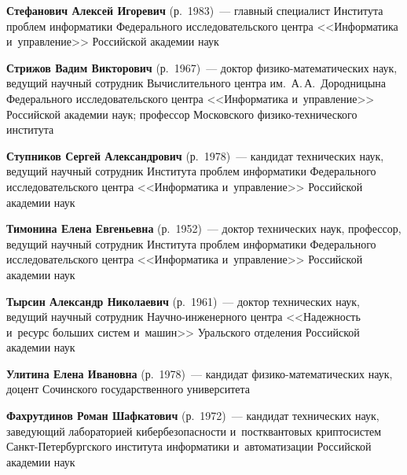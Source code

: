 \begin{multicols}{2}

\noindent
\textbf{Стефанович Алексей Игоревич} (р.\ 1983)~--- главный специалист Института 
проб\-лем информатики Федерального исследовательского центра 
<<Информатика и~управ\-ле\-ние>> Российской академии наук


\noindent
\textbf{Стрижов Вадим Викторович} (р.\ 1967)~--- 
доктор фи\-зи\-ко-ма\-те\-ма\-ти\-че\-ских наук, ведущий научный сотрудник 
Вычислительного центра им.\ А.\,А.~Дородницына Федерального 
исследовательского центра <<Информатика и~управ\-ле\-ние>>
 Российской академии наук; профессор Московского 
 фи\-зи\-ко-тех\-ни\-че\-ско\-го института


\noindent
\textbf{Ступников Сергей Александрович} (р.\ 1978)~--- 
кандидат технических наук, ведущий научный сотрудник Института проб\-лем 
информатики Федерального исследовательского центра <<Информатика и~управ\-ле\-ние>>
 Российской академии наук
 

 \noindent
\textbf{Тимонина Елена Евгеньевна} (р.\ 1952)~--- 
доктор технических наук, профессор, ведущий научный сотрудник Института проб\-лем
 информатики Федераль\-ного исследовательского центра <<Информатика и~управ\-ле\-ние>>
 Российской академии наук
 

\noindent
\textbf{Тырсин Александр Николаевич} (р.\ 1961)~--- доктор технических наук, 
ведущий научный сотрудник На\-уч\-но-ин\-же\-нер\-но\-го центра 
<<Надежность и~ресурс больших сис\-тем и~машин>>
Уральского отделения Российской академии наук



\noindent
\textbf{Улитина Елена Ивановна} (р.\ 1978)~--- 
кандидат фи\-зи\-ко-ма\-те\-ма\-ти\-че\-ских наук, 
доцент Сочинского государственного университета


\noindent
\textbf{Фахрутдинов Роман Шафкатович} (р.\ 1972)~--- 
кандидат технических наук, заведующий ла\-бо\-ра\-торией кибербезопасности 
и~постквантовых крип\-то\-сис\-тем Санкт-Пе\-тер\-бург\-ско\-го института информатики 
и~автоматизации Российской академии наук


\end{multicols}
